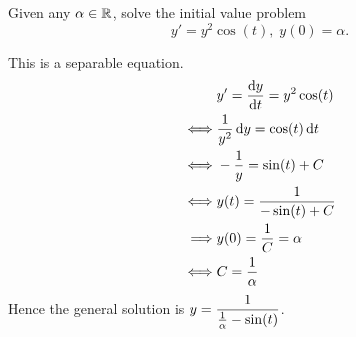 Given any $\alpha \in \mathbb{R}$, solve the initial value problem
$$y' = y^2 \cos (t),\; y(0) = \alpha.$$

\soln* This is a separable equation.
\begin{align*}
    & y' = \dv{y}{t} = y^2 \cos(t)\\
    \iff & \over{y^2} \dd{y} = \cos(t) \dd{t}\\
    \iff & -\frac{1}{y} = \sin(t) + C\\
    \iff & y(t) = \over{-\sin(t)+C}\\
    \implies &y(0) = \over{C} = \alpha\\
     \iff & C = \over{\alpha}
\end{align*}
Hence the general solution is $y = \dfrac{1}{\over{\alpha}-\sin(t)}$.